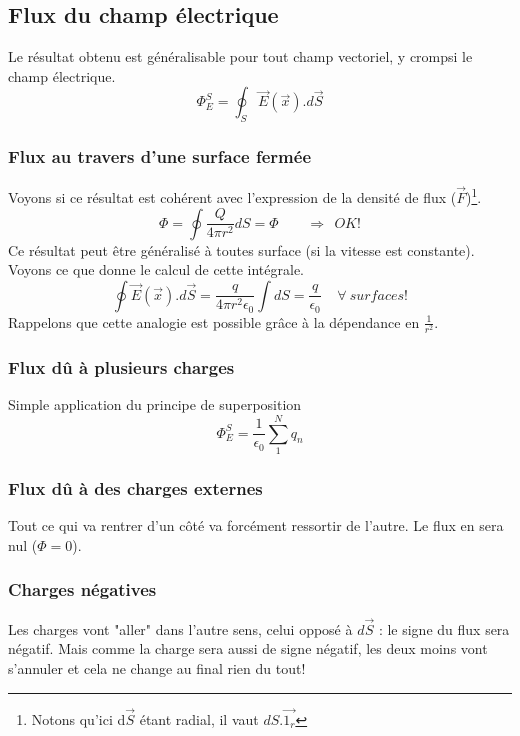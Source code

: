 \documentclass	[11pt, a4paper, openany]{book}
\begin{document}
\subsection{Flux du champ électrique}
Le résultat obtenu est généralisable pour tout champ vectoriel, y crompsi le champ électrique.
\begin{equation}
	\Phi^S_E = \oint_S \vec{E}(\vec{x}).d\vec S
\end{equation}

\subsubsection{Flux au travers d'une surface fermée}
Voyons si ce résultat est cohérent avec l'expression de la densité de flux ($\vec F$)\footnote{Notons qu'ici d$\vec{S}$ étant radial, il vaut $dS.\vec{1_r}$}.\\
\begin{equation}
	\Phi = \oint \frac{Q}{4\pi r^2} dS = \Phi\ \ \ \ \ \ \ \ \ \Rightarrow \ \ OK !
\end{equation}
Ce résultat peut être généralisé à toutes surface (si la vitesse est constante).\\
Voyons ce que donne le calcul de cette intégrale. 
\begin{equation}
	\oint \vec{E}(\vec x).d\vec{S} = \frac{q}{4\pi r^2 \epsilon_0}\int dS = \frac{q}{\epsilon_0}\ \ \ \ \ \forall\ surfaces !
\end{equation}
Rappelons que cette analogie est possible grâce à la dépendance en $\frac{1}{r^2}$.

\subsubsection{Flux dû à plusieurs charges}
Simple application du principe de superposition
\begin{equation}
	\Phi^S_E = \frac{1}{\epsilon_0}\sum_1^N q_n
\end{equation}

\subsubsection{Flux dû à des charges externes}
Tout ce qui va rentrer d'un côté va forcément ressortir de l'autre. Le flux en sera nul ($\Phi = 0$).


\subsubsection{Charges négatives}
Les charges vont "aller" dans l'autre sens, celui opposé à $d\vec S$ : le signe du flux sera négatif. Mais comme la charge sera aussi de signe négatif, les deux moins vont s'annuler et cela ne change au final rien du tout!
\end{document}
